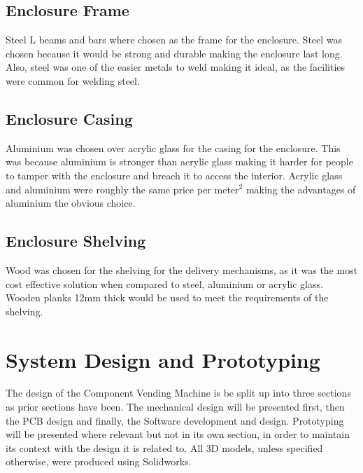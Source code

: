 \documentclass[a4paper,11pt]{article}
\numberwithin{figure}{section}
\numberwithin{table}{section}
\begin{document}
\subsection{Enclosure Frame}
Steel L beams and bars where chosen as the frame for the enclosure. Steel was chosen because it would be strong and durable making the enclosure last long. Also, steel was one of the easier metals to weld making it ideal, as the facilities were common for welding steel.

\subsection{Enclosure Casing}
Aluminium was chosen over acrylic glass for the casing for the enclosure. This was because aluminium is stronger than acrylic glass making it harder for people to tamper with the enclosure and breach it to access the interior. Acrylic glass and aluminium were roughly the same price per meter$^2$ making the advantages of aluminium the obvious choice.  

\subsection{Enclosure Shelving}
Wood was chosen for the shelving for the delivery mechanisms, as it was the most cost effective solution when compared to steel, aluminium or acrylic glass. Wooden planks 12mm thick would be used to meet the requirements of the shelving.

\newpage
\section{System Design and Prototyping}\thispagestyle{sectionstart}
The design of the Component Vending Machine is be split up into three sections as prior sections have been. The mechanical design will be presented first, then the PCB design and finally, the Software development and design. Prototyping will be presented where relevant but not in its own section, in order to maintain its context with the design it is related to. All 3D models, unless specified otherwise, were produced using Solidworks.
\end{document}
